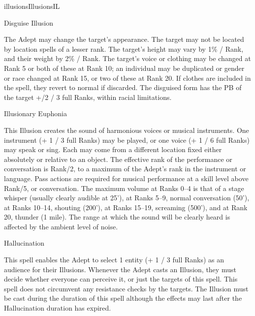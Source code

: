 \begin{College}[1.5]{illusions}{Illusions}{IL}
\begin{spell}[S-5]{Disguise Illusion}

\begin{effects}
The Adept may change the target’s appearance.  The target may not be
located by location spells of a lesser rank. The target’s height may
vary by 1\% / Rank, and their weight by 2\% / Rank.  The target’s
voice or clothing may be changed at Rank 5 or both of these at Rank
10; an individual may be duplicated or gender or race changed at Rank
15, or two of these at Rank 20. If clothes are included in the spell,
they revert to normal if discarded. The disguised form has the PB of
the target +/2 / 3 full Ranks, within racial limitations.
\end{effects}
\end{spell}

\begin{spell}[S-6]{Illusionary Euphonia}

\begin{effects}
This Illusion creates the sound of harmonious voices or musical
instruments.  One instrument (+ 1 / 3 full Ranks) may be played, or
one voice (+ 1 / 6 full Ranks) may speak or sing. Each may come from a
different location fixed either absolutely or relative to an object.
The effective rank of the performance or conversation is Rank/2, to a
maximum of the Adept’s rank in the instrument or language.  Pass
actions are required for musical performance at a skill level above
Rank/5, or conversation. The maximum volume at Ranks 0--4 is that of a
stage whisper (usually clearly audible at 25’), at Ranks 5--9, normal
conversation (50’), at Ranks 10--14, shouting (200’), at Ranks 15--19,
screaming (500’), and at Rank 20, thunder (1 mile).  The range at
which the sound will be clearly heard is affected by the ambient level
of noise.
\end{effects}
\end{spell}

\begin{spell}[S-7]{Hallucination}

\begin{effects}
This spell enables the Adept to select 1 entity (+ 1 / 3 full Ranks)
as an audience for their Illusions.  Whenever the Adept casts an
Illusion, they must decide whether everyone can perceive it, or just
the targets of this spell.  This spell does not circumvent any
resistance checks by the targets.  The Illusion must be cast during
the duration of this spell although the effects may last after the
Hallucination duration has expired.
\end{effects}
\end{spell}


\end{College}
